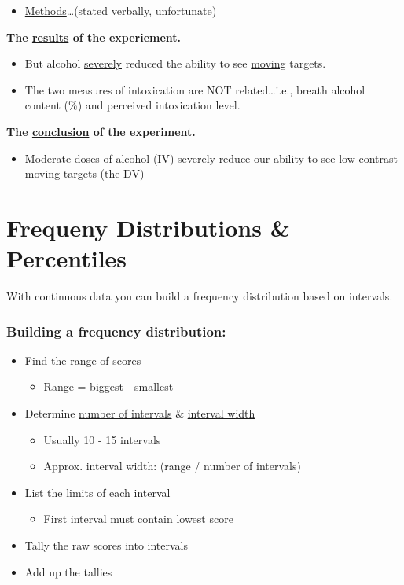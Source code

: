 \documentclass[11pt]{report}
\begin{document}
{\begin{itemize}
\begin{itemize}
            \item Many others
        \end{itemize}
        \item \underline{Methods}\dots (stated verbally, unfortunate)
    \end{itemize}
    \textbf{The \underline{results} of the experiement.}
    \begin{itemize}
        \item But alcohol \underline{severely} reduced the ability to see \underline{moving} targets.
        \item The two measures of intoxication are NOT related\dots i.e., breath alcohol content (\%) and perceived intoxication level.
    \end{itemize}
    \textbf{The \underline{conclusion} of the experiment.}
    \begin{itemize}
        \item Moderate doses of alcohol (IV) severely reduce our ability to see low contrast moving targets (the DV)
    \end{itemize}
}

\section{Frequeny Distributions \& Percentiles}

With continuous data you can build a frequency distribution based on intervals.
\subsubsection{Building a frequency distribution:}
\begin{itemize}
    \item Find the range of scores
    \begin{itemize}
        \item Range = biggest - smallest
    \end{itemize}
    \item Determine \underline{number of intervals} \& \underline{interval width}
    \begin{itemize}
        \item Usually 10 - 15 intervals 
        \item Approx. interval width: (range / number of intervals)
    \end{itemize}
    \item List the limits of each interval 
    \begin{itemize}
        \item First interval must contain lowest score
    \end{itemize}
    \item Tally the raw scores into intervals
    \item Add up the tallies 
\end{itemize} 
\end{document}

